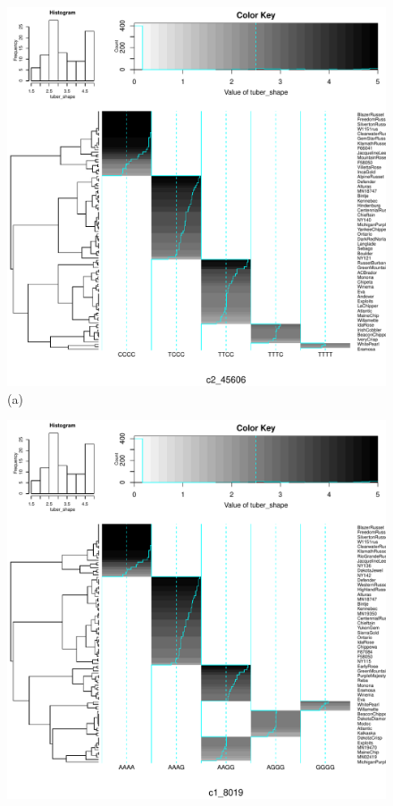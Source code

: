 \documentclass{article}
\begin{document}
\begin{figure}[H]
\noindent\begin{minipage}[t]{1\columnwidth}%
\begin{minipage}[t]{0.5\columnwidth}%
\begin{center}
\includegraphics[scale=0.3]{images/out-SNPProfile-c2_45606}\\
(a)
\par\end{center}%
\end{minipage}%
\begin{minipage}[t]{0.5\columnwidth}%
\begin{center}
\includegraphics[scale=0.3]{images/out-SNPProfile-c1_8019}\\

\end{center}
\end{minipage}
\end{minipage}
\end{figure}
\end{document}

